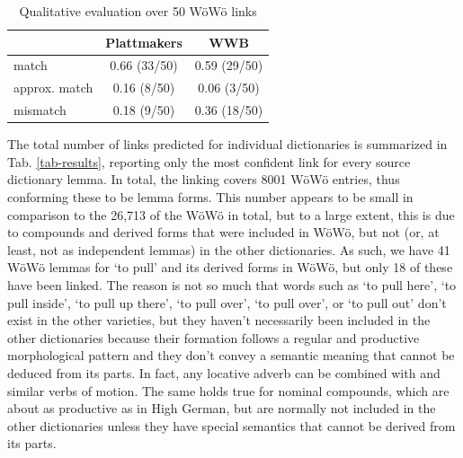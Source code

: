 \begin{table}
        \centering
        {\small 
        \begin{tabular}{lcc}
        & Plattmakers           & WWB \\\hline
        match                   & 0.66 (33/50) & 0.59 (29/50) \\
        approx. match     & 0.16 (8/50) & 0.06 (3/50) \\
        mismatch                & 0.18 (9/50) & 0.36 (18/50) \\
    \end{tabular}
    } %
    \caption{Qualitative evaluation over 50 WöWö links}
    \label{tab-eval}
\end{table}


The total number of links predicted for individual dictionaries is summarized in Tab. \ref{tab-results}, reporting only the most confident link for every source dictionary lemma.
In total, the linking covers 8001 WöWö entries, thus conforming these to be lemma forms. This number appears to be small in comparison to the 26,713 of the WöWö in total, but to a large extent, this is due to compounds and derived forms that were included in WöWö, but not (or, at least, not as independent lemmas) in the other dictionaries. As such, we have 41 WöWö lemmas for  `to pull' and its derived forms in WöWö, but only 18 of these have been linked. The reason is not so much that words such as  `to pull here',  `to pull inside',  `to pull up there',  `to pull over',  `to pull over', or  `to pull out' don't exist in the other varieties, but they haven't necessarily been included in the other dictionaries because their formation follows a regular and productive morphological pattern and they don't convey a semantic meaning that cannot be deduced from its parts. In fact, any locative adverb can be combined with  and similar verbs of motion. The same holds true for nominal compounds, which are about as productive as in High German, but are normally not included in the other dictionaries unless they have special semantics that cannot be derived from its parts.

